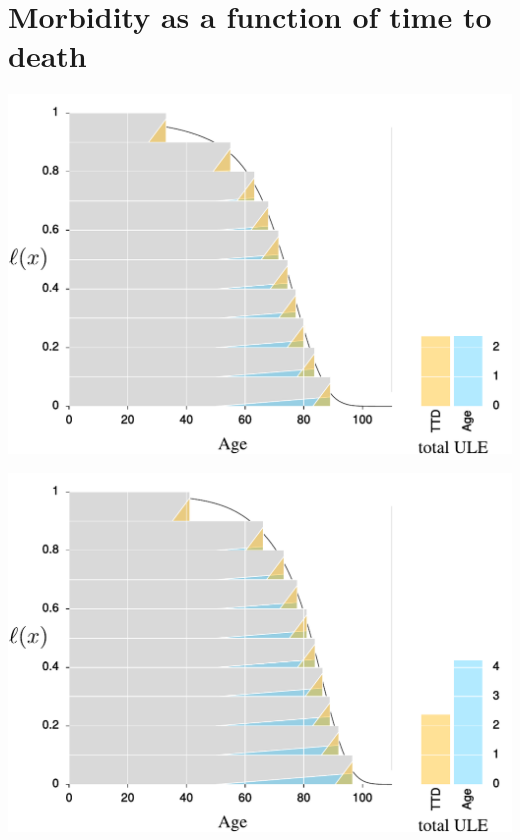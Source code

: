 \documentclass[20pt]{beamer}
\begin{document}
\section{Morbidity as a function of time to death}

\begin{frame}[plain]
\begin{center}
 \includegraphics[width=\linewidth]{Figures/Japan1970.pdf}
\end{center}
\end{frame}

\begin{frame}[plain]
\begin{center}
 \includegraphics[width=\linewidth]{Figures/Japan2010.pdf}
\end{center}
\end{frame}
\end{document}
